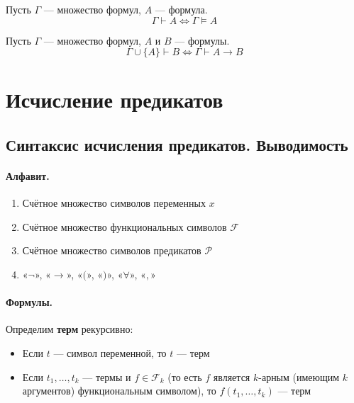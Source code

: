 \documentclass[11pt]{article}
\begin{document}
\begin{theorem}
    Пусть $\Gamma$ --- множество формул, $A$ --- формула.
    \[\Gamma \vdash A \iff \Gamma \vDash A\]
\end{theorem}

\begin{theorem}[О дедукции]
    Пусть $\Gamma$ --- множество формул, $A$ и $B$ --- формулы.
    \[\Gamma \cup \{A\} \vdash B \iff \Gamma \vdash A \to B\]
\end{theorem}

\section{Исчисление предикатов}

\subsection{Синтаксис исчисления предикатов. Выводимость}

\paragraph{Алфавит.} 
\begin{enumerate}
    \item Счётное множество символов переменных $x$
    \item Счётное множество функциональных символов $\mathcal{F}$
    \item Счётное множество символов предикатов $\mathcal{P}$
    \item «$\lnot$», «$\to$», «$($», «$)$», «$\forall$», «$,$»
\end{enumerate}

\paragraph{Формулы.}

\begin{definition}
    Определим \textbf{терм} рекурсивно:
    \begin{itemize}
        \item Если $t$ --- символ переменной, то $t$ --- терм
        \item Если $t_1, \ldots, t_k$ --- термы и $f \in \mathcal{F}_k$ (то есть $f$ является $k$-арным (имеющим $k$ аргументов) функциональным символом), то $f(t_1, \ldots, t_k)$ ---  терм
    \end{itemize}
\end{definition}
\end{document}
